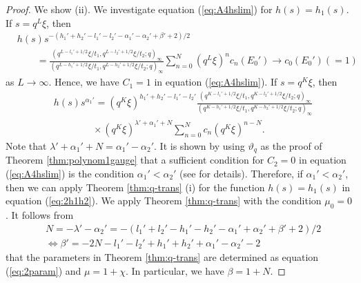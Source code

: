 \documentclass[12pt]{amsart}
\numberwithin{equation}{section}
\theoremstyle{definition}
\theoremstyle{remark}
\begin{document}
\begin{proof}
We show (ii).
We investigate equation (\ref{eq:A4hslim}) for $h(s)=h_1(s)$.
If $s= q^{L}\xi$, then
  \begin{align*}
&h(s) s^{-(h_{1}' + h_{2}' - l_{1}' - l_{2}' - \alpha_{1}' - \alpha_{2}' + \beta' + 2)/2} \\
&\qquad = \frac{(q^{L - l_{1}' + 1/2}\xi/t_{1}, q^{L - l_{2}' + 1/2}\xi/t_{2}; q)_\infty}{(q^{L - h_{1}' + 1/2}\xi/t_{1}, q^{L - h_{2}' + 1/2}\xi/t_{2}; q)_\infty} \sum_{n = 0}^{N}  (q^{L}\xi)^{n} c_{n}  (E_{0}') \to c_{0}  (E_{0}') (=1) 
  \end{align*}
as $L \to \infty $. 
Hence, we have $C_1 =1$ in equation (\ref{eq:A4hslim}).
If $s= q^{K}\xi$, then
  \begin{align*}
 & h(s) s^{\alpha_{1}'}  = (q^{K}\xi)^{h_{1}' + h_{2}' - l_{1}' - l_{2}'} \frac{(q^{K - l_{1}' + 1/2}\xi/t_{1}, q^{K - l_{2}' + 1/2}\xi/t_{2}; q)_\infty}{(q^{K - h_{1}' + 1/2}\xi/t_{1}, q^{K - h_{2}' + 1/2}\xi/t_{2}; q)_\infty} \\
& \qquad \qquad \times (q^{K}\xi)^{\lambda ' + \alpha_{1}' +N} \sum_{n = 0}^{N} c_{n}(q^{K}\xi)^{n-N} . 
  \end{align*}
Note that $\lambda ' + \alpha_{1}' +N = \alpha_{1}' -\alpha_{2}' $.
It is shown by using $\vartheta _q $ as the proof of  Theorem \ref{thm:polynom1gauge} that a sufficient condition for $C_2 =0$ in equation (\ref{eq:A4hslim}) is the condition $\alpha_{1}' < \alpha_{2}' $ (see \cite{Mm} for details).
Therefore, if $ \alpha_{1}' < \alpha_{2}'$, then we can apply Theorem \ref{thm:q-trans} (i) for the function $h(s) = h_1(s)$ in equation (\ref{eq:2h1h2}).
We apply Theorem \ref{thm:q-trans} with the condition $\mu _0=0$.
It follows from
  \begin{align*}
    &N = -\lambda ' - \alpha_{2}' = -(l_{1}' + l_{2}' - h_{1}' - h_{2}' - \alpha_{1}' + \alpha_{2}' + \beta' + 2)/2 \\
    &\Leftrightarrow \beta' = - 2N - l_{1}' - l_{2}' + h_{1}' + h_{2}' + \alpha_{1}' - \alpha_{2}' - 2
  \end{align*}
that the parameters in Theorem \ref{thm:q-trans} are determined as equation (\ref{eq:2param}) and $\mu = 1 + \chi $. 
In particular, we have $\beta = 1 + N$.


\end{proof}
\end{document}
